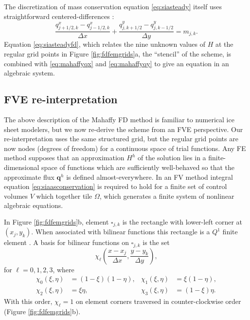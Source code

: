 \documentclass[review,letterpaper]{igs}
\newcommand\bq{\mathbf{q}}
\begin{document}
The discretization of mass conservation equation \eqref{eq:siasteady} itself uses straightforward centered-differences \citep{MortonMayers2005}:
\begin{equation}
\frac{q^x_{j+1/2,k} - q^x_{j-1/2,k}}{\Delta x} + \frac{q^y_{j,k+1/2}- q^y_{j,k-1/2}}{\Delta y} = m_{j,k}.  \label{eq:siasteadyfd}
\end{equation}
Equation \eqref{eq:siasteadyfd}, which relates the nine unknown values of $H$ at the regular grid points in Figure \ref{fig:fdfemgrids}a, the ``stencil'' of the scheme, is combined with \eqref{eq:mahaffyqx} and \eqref{eq:mahaffyqy} to give an equation in an algebraic system.


\subsection{FVE re-interpretation}

The above description of the Mahaffy FD method is familiar to numerical ice sheet modelers, but we now re-derive the scheme from an FVE perspective.  Our re-interpretation uses the same structured grid, but the regular grid points are now nodes (degrees of freedom) for a continuous space of trial functions.  Any FE method supposes that an approximation $H^h$ of the solution lies in a finite-dimensional space of functions which are sufficiently well-behaved so that the approximate flux $\bq^h$ is defined almost-everywhere.  In an FV method integral equation \eqref{eq:siaasconservation} is required to hold for a finite set of control volumes $V$ which together tile $\Omega$, which generates a finite system of nonlinear algebraic equations.

In Figure \ref{fig:fdfemgrids}b, element $\square_{j,k}$ is the rectangle with lower-left corner at $(x_j,y_k)$.  When associated with bilinear functions this rectangle is a $Q^1$ finite element \citep{Elmanetal2005}.  A basis for bilinear functions on $\square_{j,k}$ is the set
\begin{equation}
\chi_\ell \left(\frac{x-x_j}{\Delta x},\frac{y-y_k}{\Delta y}\right), \label{eq:elementbasis}
\end{equation}
for $\ell=0,1,2,3$, where
\begin{align*}
\chi_0(\xi,\eta) &= \left(1-\xi\right) \left(1-\eta\right), & \chi_1(\xi,\eta) &= \xi \left(1-\eta\right), \\
\chi_2(\xi,\eta) &= \xi \eta, & \chi_3(\xi,\eta) &= \left(1-\xi\right) \eta.
\end{align*}
With this order, $\chi_\ell=1$ on element corners traversed in counter-clockwise order (Figure \ref{fig:fdfemgrids}b).  
\end{document}
